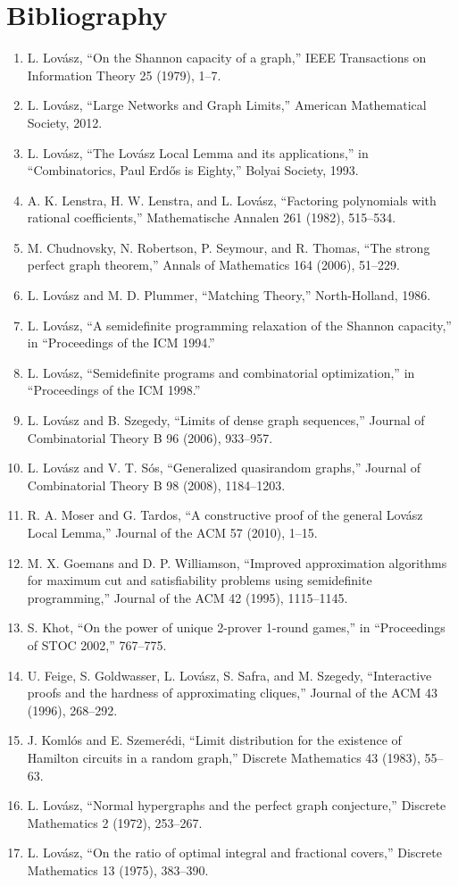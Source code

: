 \section*{Bibliography}
\begin{enumerate}
\item L. Lov\'asz, ``On the Shannon capacity of a graph,'' IEEE Transactions on Information Theory 25 (1979), 1--7.
\item L. Lov\'asz, ``Large Networks and Graph Limits,'' American Mathematical Society, 2012.
\item L. Lov\'asz, ``The Lov\'asz Local Lemma and its applications,'' in ``Combinatorics, Paul Erd\H{o}s is Eighty,'' Bolyai Society, 1993.
\item A. K. Lenstra, H. W. Lenstra, and L. Lov\'asz, ``Factoring polynomials with rational coefficients,'' Mathematische Annalen 261 (1982), 515--534.
\item M. Chudnovsky, N. Robertson, P. Seymour, and R. Thomas, ``The strong perfect graph theorem,'' Annals of Mathematics 164 (2006), 51--229.
\item L. Lov\'asz and M. D. Plummer, ``Matching Theory,'' North-Holland, 1986.
\item L. Lov\'asz, ``A semidefinite programming relaxation of the Shannon capacity,'' in ``Proceedings of the ICM 1994.''
\item L. Lov\'asz, ``Semidefinite programs and combinatorial optimization,'' in ``Proceedings of the ICM 1998.''
\item L. Lov\'asz and B. Szegedy, ``Limits of dense graph sequences,'' Journal of Combinatorial Theory B 96 (2006), 933--957.
\item L. Lov\'asz and V. T. S\'os, ``Generalized quasirandom graphs,'' Journal of Combinatorial Theory B 98 (2008), 1184--1203.
\item R. A. Moser and G. Tardos, ``A constructive proof of the general Lov\'asz Local Lemma,'' Journal of the ACM 57 (2010), 1--15.
\item M. X. Goemans and D. P. Williamson, ``Improved approximation algorithms for maximum cut and satisfiability problems using semidefinite programming,'' Journal of the ACM 42 (1995), 1115--1145.
\item S. Khot, ``On the power of unique 2-prover 1-round games,'' in ``Proceedings of STOC 2002,'' 767--775.
\item U. Feige, S. Goldwasser, L. Lov\'asz, S. Safra, and M. Szegedy, ``Interactive proofs and the hardness of approximating cliques,'' Journal of the ACM 43 (1996), 268--292.
\item J. Koml\'os and E. Szemer\'edi, ``Limit distribution for the existence of Hamilton circuits in a random graph,'' Discrete Mathematics 43 (1983), 55--63.
\item L. Lov\'asz, ``Normal hypergraphs and the perfect graph conjecture,'' Discrete Mathematics 2 (1972), 253--267.
\item L. Lov\'asz, ``On the ratio of optimal integral and fractional covers,'' Discrete Mathematics 13 (1975), 383--390.
\end{enumerate}
